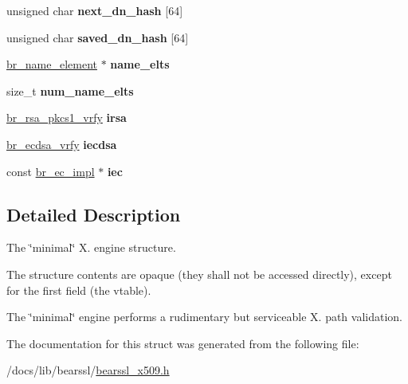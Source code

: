 \begin{DoxyCompactItemize}
\item 
\mbox{\label{structbr__x509__minimal__context_a942dffb82326ff8f9ad9381e1302251c}} 
unsigned char {\bfseries next\+\_\+dn\+\_\+hash} \mbox{[}64\mbox{]}
\item 
\mbox{\label{structbr__x509__minimal__context_aab7f2b88ab53ac8f5e98d95dbf8c9c04}} 
unsigned char {\bfseries saved\+\_\+dn\+\_\+hash} \mbox{[}64\mbox{]}
\item 
\mbox{\label{structbr__x509__minimal__context_ad8cd2409c592a7ea5703709cc01485e8}} 
\hyperlink{structbr__name__element}{br\+\_\+name\+\_\+element} $\ast$ {\bfseries name\+\_\+elts}
\item 
\mbox{\label{structbr__x509__minimal__context_a5ec0576b4ce5c0f2ee44251ffb2f90fe}} 
size\+\_\+t {\bfseries num\+\_\+name\+\_\+elts}
\item 
\mbox{\label{structbr__x509__minimal__context_a7b685de41d456f7858163017425a616e}} 
\hyperlink{bearssl__rsa_8h_a9ee06c1a4ae5af9e900d877a87ec8b17}{br\+\_\+rsa\+\_\+pkcs1\+\_\+vrfy} {\bfseries irsa}
\item 
\mbox{\label{structbr__x509__minimal__context_a1a99221f08a19a59a49642873a24e784}} 
\hyperlink{bearssl__ec_8h_abaff5c9daad6e7dc61e4a1004ef1c8c8}{br\+\_\+ecdsa\+\_\+vrfy} {\bfseries iecdsa}
\item 
\mbox{\label{structbr__x509__minimal__context_ab6732239169636811c683be8a3ab68f7}} 
const \hyperlink{structbr__ec__impl}{br\+\_\+ec\+\_\+impl} $\ast$ {\bfseries iec}
\end{DoxyCompactItemize}


\subsection{Detailed Description}
The \char`\"{}minimal\char`\"{} X. engine structure. 

The structure contents are opaque (they shall not be accessed directly), except for the first field (the vtable).

The \char`\"{}minimal\char`\"{} engine performs a rudimentary but serviceable X. path validation. 

The documentation for this struct was generated from the following file\+:\begin{DoxyCompactItemize}
\item 
/docs/lib/bearssl/\hyperlink{bearssl__x509_8h}{bearssl\+\_\+x509.\+h}\end{DoxyCompactItemize}
